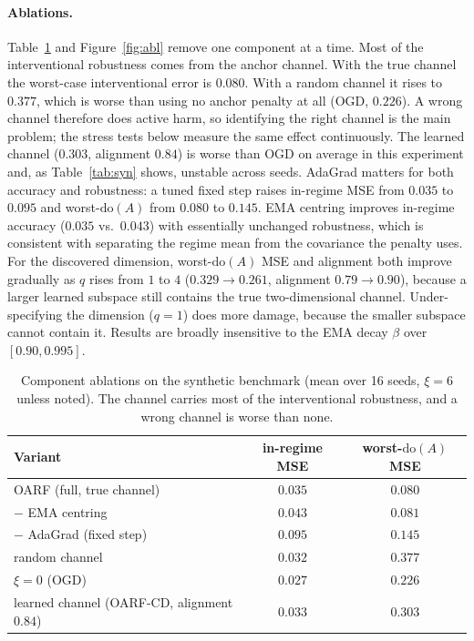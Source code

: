 \documentclass[11pt]{article}
\theoremstyle{plain}
\theoremstyle{remark}
\newcommand{\doop}{\mathrm{do}}
\newcommand{\OARF}{\textsc{OARF}}
\newcommand{\OARFCD}{\textsc{OARF-CD}}
\begin{document}
\paragraph{Ablations.}
Table~\ref{tab:abl} and Figure~\ref{fig:abl} remove one component at a time. Most of the
interventional robustness comes from the anchor channel. With the true channel the
worst-case interventional error is $0.080$. With a random channel it rises to $0.377$,
which is worse than using no anchor penalty at all (OGD, $0.226$). A wrong channel
therefore does active harm, so identifying the right channel is the main problem; the
stress tests below measure the same effect continuously. The learned channel ($0.303$, alignment $0.84$) is worse than OGD on average in this experiment and, as Table~\ref{tab:syn}
shows, unstable across seeds. AdaGrad matters for both accuracy and robustness: a tuned
fixed step raises in-regime MSE from $0.035$ to $0.095$ and worst-$\doop(A)$ from $0.080$
to $0.145$. EMA centring improves in-regime accuracy ($0.035$ vs.\ $0.043$) with
essentially unchanged robustness, which is consistent with separating the regime mean from
the covariance the penalty uses. For the discovered dimension, worst-$\doop(A)$ MSE and
alignment both improve gradually as $q$ rises from $1$ to $4$ ($0.329\!\to\!0.261$,
alignment $0.79\!\to\!0.90$), because a larger learned subspace still contains the true
two-dimensional channel. Under-specifying the dimension ($q=1$) does more damage, because
the smaller subspace cannot contain it. Results are broadly insensitive to the EMA decay
$\beta$ over $[0.90,0.995]$.

\begin{table}[htbp]
\centering
\caption{Component ablations on the synthetic benchmark (mean over 16 seeds, $\xi=6$
unless noted). The channel carries most of the interventional robustness, and a wrong
channel is worse than none.}
\label{tab:abl}
\small
\begin{tabular}{lcc}
\toprule
Variant & in-regime MSE & worst-$\doop(A)$ MSE\\
\midrule
\OARF{} (full, true channel) & $0.035$ & $\mathbf{0.080}$\\
\quad $-$ EMA centring        & $0.043$ & $0.081$\\
\quad $-$ AdaGrad (fixed step) & $0.095$ & $0.145$\\
\quad random channel          & $0.032$ & $0.377$\\
\quad $\xi=0$ (OGD)           & $0.027$ & $0.226$\\
\midrule
learned channel (\OARFCD{}, alignment $0.84$) & $0.033$ & $0.303$\\
\bottomrule
\end{tabular}
\end{table}
\end{document}
